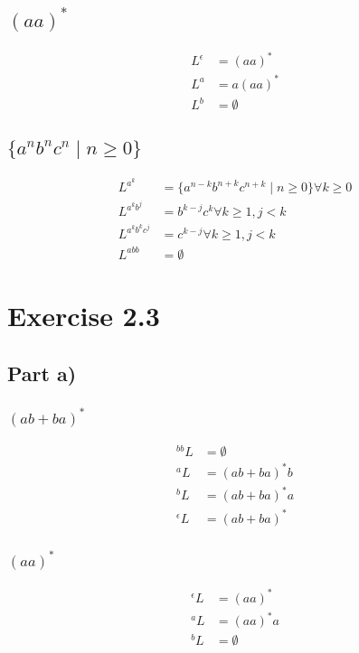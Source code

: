 \documentclass[10pt,a4paper]{article}
\begin{document}
\subsection*{$(aa)^{*}$}

\begin{align*}
  L^{\epsilon} & = (aa)^{*}\\
  L^{a} & = a(aa)^{*}\\
  L^{b} & = \emptyset
\end{align*}

\subsection*{$\{ a^{n}b^{n}c^{n} \mid n \ge 0 \}$}

\begin{align*}
  L^{a^{k}} & = \{ a^{n - k}b^{n + k}c^{n + k} \mid n \ge 0 \} \forall k \ge 0\\
  L^{a^{k}b^{j}} & = b^{k - j}c^{k} \forall k \ge 1, j < k\\
  L^{a^{k}b^{k}c^{j}} & = c^{k - j} \forall k \ge 1, j < k\\
  L^{abb} & = \emptyset
\end{align*}

\section*{Exercise 2.3}

\subsection*{Part a)}

\subsubsection*{$(ab + ba)^{*}$}

\begin{align*}
  {}^{bb}L & = \emptyset\\
  {}^{a}L & = (ab + ba)^{*}b\\
  {}^{b}L & = (ab + ba)^{*}a\\
  {}^{\epsilon}L & = (ab + ba)^{*}
\end{align*}

\subsubsection*{$(aa)^{*}$}

\begin{align*}
  {}^{\epsilon}L & = (aa)^{*}\\
  {}^{a}L & = (aa)^{*}a\\
  {}^{b}L & = \emptyset
\end{align*}
\end{document}
